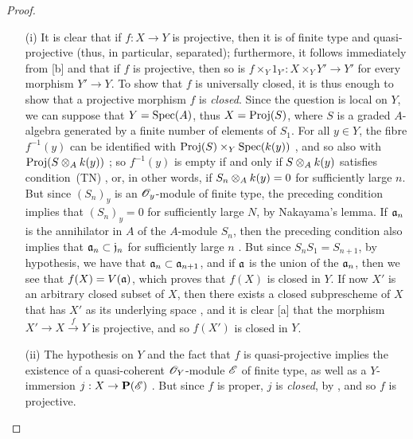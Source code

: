\begin{proof}
\label{proof-II.5.5.3}
\medskip\noindent
\begin{enumerate}
  \item[(i)] It is clear that if $f:X\to Y$ is projective, then it is of finite type and quasi-projective (thus, in particular, separated); furthermore, it follows immediately from [b] and  that if $f$ is projective, then so is $f\times_Y 1_{Y'}:X\times_Y Y'\to Y'$ for every morphism $Y'\to Y$.
     To show that $f$ is universally closed, it is thus enough to show that a projective morphism $f$ is \emph{closed}.
     Since the question is local on $Y$, we can suppose that $Y=\operatorname{Spec}(A)$, thus  $X=\operatorname{Proj}(S)$, where $S$ is a graded $A$-algebra generated by a finite number of elements of $S_1$.
     For all $y\in Y$, the fibre $f^{-1}(y)$ can be identified with $\operatorname{Proj}(S)\times_Y\operatorname{Spec}(k(y))$ , and so also with $\operatorname{Proj}(S\otimes_Ak(y))$ ;
     so $f^{-1}(y)$ is empty if and only if $S\otimes_Ak(y)$ satisfies condition~(TN) , or, in other words, if $S_n\otimes_Ak(y)=0$ for sufficiently large $n$.
     But since $(S_n)_y$ is an $\mathscr{O}_y$-module of finite type, the preceding condition implies that $(S_n)_y=0$ for sufficiently large $N$, by Nakayama's lemma.
     If $\mathfrak{a}_n$ is the annihilator in $A$ of the $A$-module $S_n$, then the preceding condition also implies that $\mathfrak{a}_n\subset\mathfrak{j}_n$ for sufficiently large $n$ .
     But since $S_nS_1=S_{n+1}$, by hypothesis, we have that $\mathfrak{a}_n\subset\mathfrak{a}_{n+1}$, and if $\mathfrak{a}$ is the union of the $\mathfrak{a}_n$, then we see that $f(X)=V(\mathfrak{a})$, which proves that $f(X)$ is closed in $Y$.
     If now $X'$ is an arbitrary closed subset of $X$, then there exists a closed subprescheme of $X$ that has $X'$ as its underlying space , and it is clear [a] that the morphism $X'\to X\xrightarrow{f}Y$ is projective, and so $f(X')$ is closed in $Y$.
   \item[(ii)] The hypothesis on $Y$ and the fact that $f$ is quasi-projective implies the existence of a quasi-coherent $\mathscr{O}_Y$-module $\mathscr{E}$ of finite type, as well as a $Y$-immersion $j:X\to\bb{P}(\sh{E})$ .
      But since $f$ is proper, $j$ is \emph{closed}, by , and so $f$ is projective.
\end{enumerate}
\end{proof}

